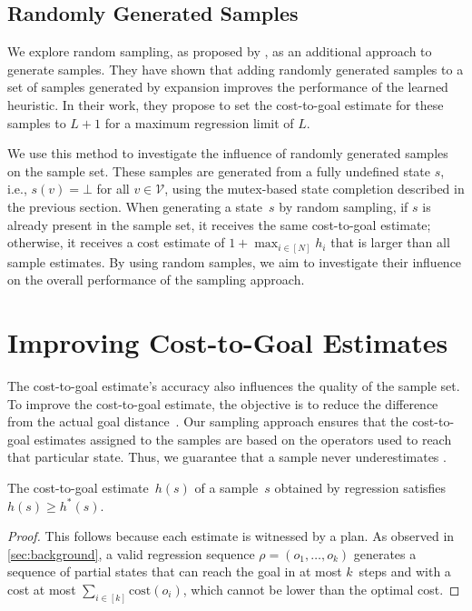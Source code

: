 \subsection{Randomly Generated Samples}
\label{sec:random-samples}

We explore random sampling, as proposed by \citet{otoole2022sampling}, as an additional approach to generate samples. They have shown that adding randomly generated samples to a set of samples generated by expansion improves the performance of the learned heuristic. In their work, they propose to set the cost-to-goal estimate for these samples to $L+1$ for a maximum regression limit of $L$.

We use this method to investigate the influence of randomly generated samples on the sample set. These samples are generated from a fully undefined state $s$, i.e., $s(v) = \bot$ for all $v \in \mathcal{V}$, using the mutex-based state completion described in the previous section. When generating a state~$s$ by random sampling, if $s$ is already present in the sample set, it receives the same cost-to-goal estimate; otherwise, it receives a cost estimate of $1+\max_{i\in[N]} h_i$ that is larger than all sample estimates. By using random samples, we aim to investigate their influence on the overall performance of the sampling approach.

\section{Improving Cost-to-Goal Estimates}
\label{sec:cost-to-goal-estimates}

The cost-to-goal estimate's accuracy also influences the quality of the sample set. To improve the cost-to-goal estimate, the objective is to reduce the difference from the actual goal distance~\hstar. Our sampling approach ensures that the cost-to-goal estimates assigned to the samples are based on the operators used to reach that particular state. Thus, we guarantee that a sample never underestimates \hstar.

\newpage

\begin{property}
    \label{prop:hvalue}
    The cost-to-goal estimate~$h(s)$ of a sample~$s$ obtained by regression satisfies $h(s)\geq h^*(s)$.
\end{property}
\begin{proof}
    This follows because each estimate is witnessed by a plan. As observed in \cref{sec:background}, a valid regression sequence $\rho=(o_1,\ldots,o_k)$ generates a sequence of partial states that can reach the goal in at most $k$~steps and with a cost at most $\sum_{i\in[k]}\text{cost}(o_i)$, which cannot be lower than the optimal cost.
\end{proof}

